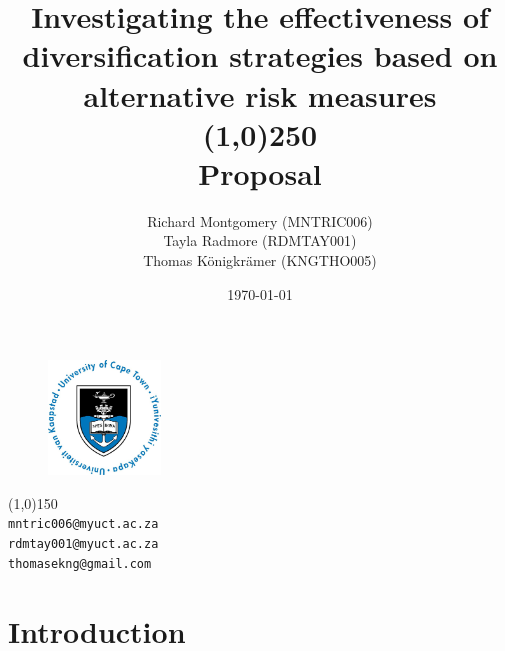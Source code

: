 \documentclass[12pt,a4paper]{article}
\begin{document}
\begin{titlepage}

\title{Investigating the effectiveness of diversification strategies based on alternative risk measures\\
\line(1,0){250}\\
\large Proposal}

\date{\today}

\author{Richard Montgomery (MNTRIC006)\\
Tayla Radmore (RDMTAY001)\\
Thomas K{\"o}nigkr{\"a}mer (KNGTHO005)}

\maketitle

\begin{figure}

\begin{center}
\includegraphics[width=3cm]{UCTlogo.jpg}\\[1cm]
\end{center}

\end{figure}

\begin{center}
\line(1,0){150}\\
{\tt mntric006@myuct.ac.za}\\
{\tt rdmtay001@myuct.ac.za}\\
{\tt thomasekng@gmail.com}
\end{center}

\thispagestyle{empty}

\end{titlepage}


\tableofcontents

\newpage


\section{Introduction}
\label{sec:Intro}
\end{document}
